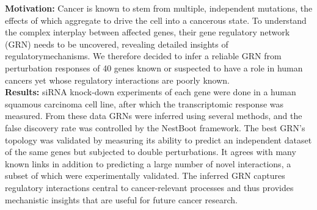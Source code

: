 \documentclass[a0,portrait]{a0poster}
\begin{document}
\begin{multicols}{2} %


\color{Navy} %


\noindent\textbf{Motivation:} Cancer is known to stem from multiple, independent mutations, the effects of which aggregate to drive the cell into a cancerous state. To understand the complex interplay between affected genes, their gene regulatory network (GRN) needs to be uncovered, revealing detailed insights of regulatorymechanisms. We therefore decided to infer a reliable GRN from perturbation responses of 40 genes known or suspected to have a role in human cancers yet whose regulatory interactions are poorly known. \\
\textbf{Results:} siRNA knock-down experiments of each gene were done in a human squamous carcinoma cell line, after which the transcriptomic response was measured. From these data GRNs were inferred using several methods, and the false discovery rate was controlled by the NestBoot framework. The best GRN's topology was validated by measuring its ability to predict an independent dataset of the same genes but subjected to double perturbations. It agrees with many known links in addition to predicting a large number of novel interactions, a subset of which were experimentally validated. The inferred GRN captures regulatory interactions central to cancer-relevant processes and thus provides mechanistic insights that are useful for future cancer research. 
\color{Black}




\end{multicols}
\end{document}
